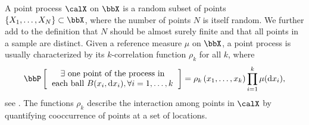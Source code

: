 \documentclass[twoside,11pt]{article}
\begin{document}
    A point process $\calX$ on $\bbX$ is a random subset of points $\lrcb{X_1, \dots, X_N} \subset \bbX$, where the number of points $N$ is itself random. 
    We further add to the definition that $N$ should be almost surely finite and that all points in a sample are distinct. 
    Given a reference measure $\mu$ on $\bbX$, a point process is usually characterized by its $k$-correlation function $\rho_k$ for all $k$, where
    \begin{equation*}
    	\Proba{
    		\begin{tabular}{c}
    			$\exists$ one point of the process in\\
    			each ball $B(x_i, \diff x_i), \forall i=1,\dots, k $
    		\end{tabular}
    	}
    	= \rho_k\lrp{x_1,\dots,x_k}
    		\prod_{i=1}^k \mu(\diff x_i),
    \end{equation*}
    see \citet[Section 4]{MoWa04}. 
    The functions $\rho_k$ describe the interaction among points in $\calX$ by quantifying cooccurrence of points at a set of locations.

\end{document}
